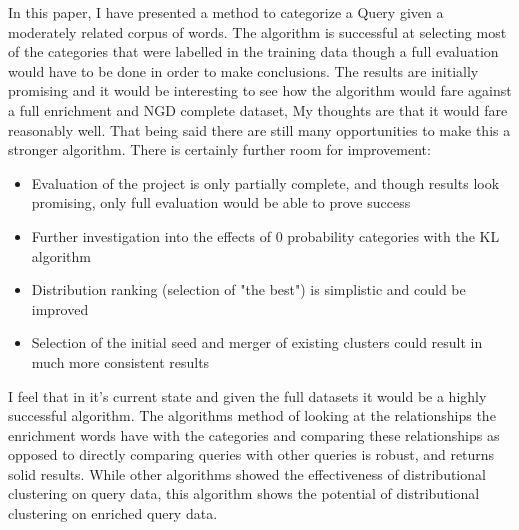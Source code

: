 \documentclass[letterpaper]{article}
\begin{document}
In this paper, I have presented a method to categorize a Query given a moderately related corpus of words. The algorithm is successful at selecting most of the categories that were labelled in the training data though a full evaluation would have to be done in order to make conclusions. The results are initially promising and it would be interesting to see how the algorithm would fare against a full enrichment and NGD complete dataset, My thoughts are that it would fare reasonably well. That being said there are still many opportunities to make this a stronger algorithm.
There is certainly further room for improvement:
\begin{itemize}
\item Evaluation of the project is only partially complete, and though results look promising, only full evaluation would be able to prove success
\item Further investigation into the effects of 0 probability categories with the KL algorithm
\item Distribution ranking (selection of "the best") is simplistic and could be improved
\item Selection of the initial seed and merger of existing clusters could result in much more consistent results
\end{itemize}

 I feel that in it's current state and given the full datasets it would be a highly successful algorithm. The algorithms method of looking at the relationships the enrichment words have with the categories and comparing these relationships as opposed to directly comparing queries with other queries  is robust, and returns solid results. While other algorithms showed the effectiveness of distributional clustering on query data, this algorithm shows the potential  of distributional clustering on enriched query data.






\end{document}
